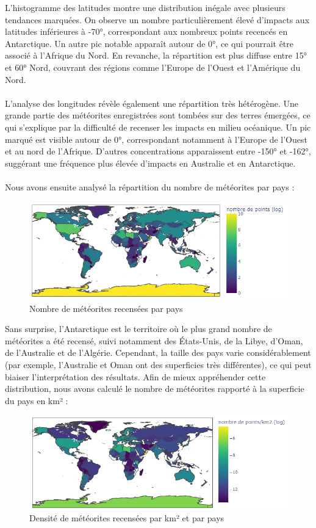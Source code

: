 \documentclass[12pt]{article}
\begin{document}
L'histogramme des latitudes montre une distribution inégale avec plusieurs tendances marquées. On observe un nombre particulièrement élevé d'impacts aux latitudes inférieures à -70°, correspondant aux nombreux points recencés en Antarctique. Un autre pic notable apparaît autour de 0°, ce qui pourrait être associé à l'Afrique du Nord. En revanche, la répartition est plus diffuse entre 15° et 60° Nord, couvrant des régions comme l'Europe de l'Ouest et l'Amérique du Nord.\\
\\
L'analyse des longitudes révèle également une répartition très hétérogène. Une grande partie des météorites enregistrées sont tombées sur des terres émergées, ce qui s'explique par la difficulté de recenser les impacts en milieu océanique. Un pic marqué est visible autour de 0°, correspondant notamment à l'Europe de l'Ouest et au nord de l'Afrique. D'autres concentrations apparaissent entre -150° et -162°, suggérant une fréquence plus élevée d'impacts en Australie et en Antarctique.\\
\\
Nous avons ensuite analysé la répartition du nombre de météorites par pays :
\begin{figure}[H]
 \centering 
\includegraphics[width=17cm]{Images/exploration/map_points_countries_avec_echelle.png}
 \caption{Nombre de météorites recensées par pays}
 \end{figure}
Sans surprise, l’Antarctique est le territoire où le plus grand nombre de météorites a été recensé, suivi notamment des États-Unis, de la Libye, d’Oman, de l’Australie et de l’Algérie. Cependant, la taille des pays varie considérablement (par exemple, l’Australie et Oman ont des superficies très différentes), ce qui peut biaiser l’interprétation des résultats. Afin de mieux appréhender cette distribution, nous avons calculé le nombre de météorites rapporté à la superficie du pays en km² :
\begin{figure}[H] 
\centering
 \includegraphics[width=17cm]{Images/exploration/map_points_km2_avec_echelle.png}
 \caption{Densité de météorites recensées par km² et par pays}
 \end{figure}
\end{document}
